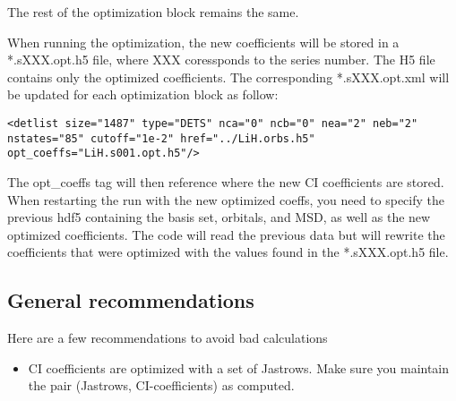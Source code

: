 The rest of the optimization block remains the same. 

When running the optimization, the new coefficients will be stored in a *.sXXX.opt.h5 file,  where XXX coressponds to the series number. The H5 file contains only the optimized coefficients. The corresponding *.sXXX.opt.xml  will be updated for each optimization block as follow: 
\begin{lstlisting}[style=QMCPXML]
<detlist size="1487" type="DETS" nca="0" ncb="0" nea="2" neb="2" nstates="85" cutoff="1e-2" href="../LiH.orbs.h5" opt_coeffs="LiH.s001.opt.h5"/>
\end{lstlisting}

The opt\_coeffs tag will then reference where the new CI coefficients are stored.\\

When restarting the run with the new optimized coeffs, you need to specify the previous hdf5 containing the basis set, orbitals, and MSD, as well as the new optimized coefficients. The code will read the previous data but will rewrite the coefficients that were optimized with the values found in the *.sXXX.opt.h5 file. 
\subsection{General recommendations}
Here are a few recommendations to avoid bad calculations
\begin{itemize}
\item CI coefficients are optimized with a set of Jastrows. Make sure you maintain the pair (Jastrows, CI-coefficients) as computed. 
\end{itemize}


